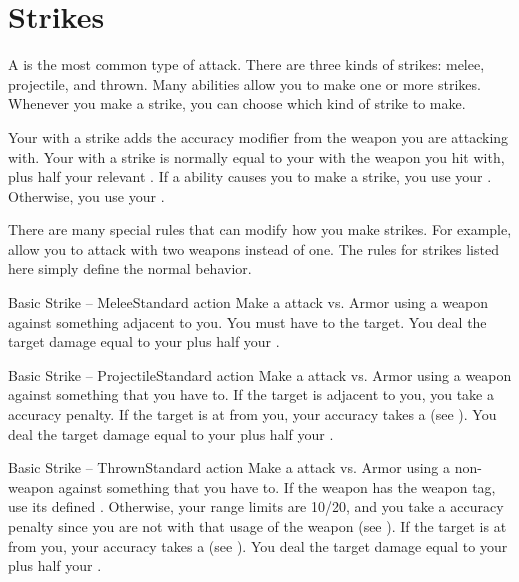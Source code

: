\section{Strikes}\label{Strikes}
  A  is the most common type of attack.
  There are three kinds of strikes: melee, projectile, and thrown.
  Many abilities allow you to make one or more strikes.
  Whenever you make a strike, you can choose which kind of strike to make.

  Your  with a strike adds the accuracy modifier from the weapon you are attacking with.
  Your  with a strike is normally equal to your  with the weapon you hit with, plus half your relevant .
  If a \magical ability causes you to make a strike, you use your .
  Otherwise, you use your .

  There are many special rules that can modify how you make strikes.
  For example,  allow you to attack with two weapons instead of one.
  The rules for strikes listed here simply define the normal behavior.

  \begin{activeability}{Basic Strike -- Melee}{Standard action}
    \rankline
    Make a  attack vs. Armor using a weapon against something adjacent to you.
    You must have  to the target.
    \hit You deal the target damage equal to your  plus half your .
  \end{activeability}

  \begin{activeability}{Basic Strike -- Projectile}{Standard action}
    \rankline
    Make a  attack vs. Armor using a  weapon against something that you have  to.
    If the target is adjacent to you, you take a  accuracy penalty.
    If the target is at  from you, your accuracy takes a   (see ).
    \hit You deal the target damage equal to your  plus half your .
  \end{activeability}

  \begin{activeability}{Basic Strike -- Thrown}{Standard action}
    \rankline
    Make a  attack vs. Armor using a non- weapon against something that you have  to.
    If the weapon has the  weapon tag, use its defined .
    Otherwise, your range limits are 10/20, and you take a  accuracy penalty since you are not  with that usage of the weapon (see ).
    If the target is at  from you, your accuracy takes a   (see ).
    \hit You deal the target damage equal to your  plus half your .
  \end{activeability}

